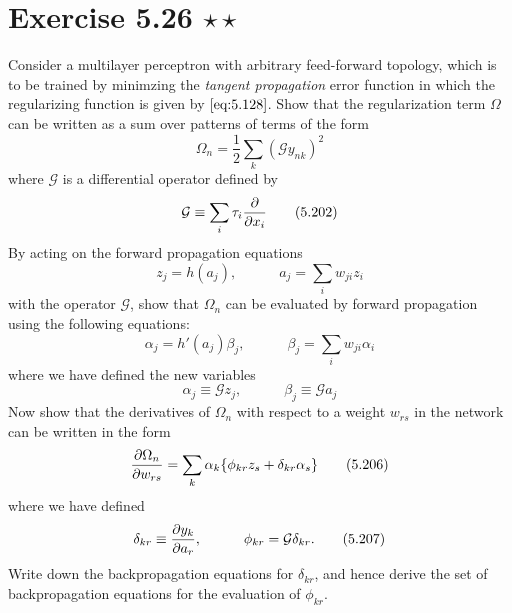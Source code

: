 \section*{Exercise 5.26 $\star \star$}
Consider a multilayer perceptron with arbitrary feed-forward topology, 
which is to be trained by minimzing the \emph{tangent propagation} error
function in which the regularizing function is given by
$\eqref{eq:5.128}$. Show that the regularization term $\Omega$ can
be written as a sum over patterns of terms of the form
\begin{equation*}
    \Omega_n = \frac{1}{2} \sum_{k} (\mathcal{G}y_{nk})^2
    \tag{5.201}\label{eq:5.201}
\end{equation*}
where $\mathcal{G}$ is a differential operator defined by 
\begin{equation*}
    \mathcal{G} \equiv \sum_{i} \tau_i \pdv{x_i}
    \tag{5.202}\label{eq:5.202}
\end{equation*}
By acting on the forward propagation equations
\begin{equation*}
    z_j = h(a_j),
    \hspace{3em}
    a_j = \sum_{i} w_{ji} z_i
    \tag{5.203}\label{eq:5.203}
\end{equation*}
with the operator $\mathcal{G}$, show that $\Omega_n$ 
can be evaluated by forward propagation using the following equations:
\begin{equation*}
    \alpha_j = h'(a_j) \beta_j,
    \hspace{3em}
    \beta_j = \sum_{i} w_{ji} \alpha_i
    \tag{5.204}\label{eq:5.204}
\end{equation*}
where we have defined the new variables
\begin{equation*}
    \alpha_j \equiv \mathcal{G} z_j,
    \hspace{3em}
    \beta_j \equiv \mathcal{G} a_j
    \tag{5.205}\label{eq:5.205}
\end{equation*}
Now show that the derivatives of $\Omega_n$ with respect to a weight $w_{rs}$ in the network 
can be written in the form  
\begin{equation*}
    \pdv{\Omega_n}{w_{rs}} = \sum_{k} \alpha_k \{\phi_{kr} z_s + \delta_{kr} \alpha_s\}
    \tag{5.206}\label{eq:5.206}
\end{equation*}
where we have defined 
\begin{equation*}
    \delta_{kr} \equiv \pdv{y_k}{a_r},
    \hspace{3em}
    \phi_{kr} = \mathcal{G} \delta_{kr}.
    \tag{5.207}\label{eq:5.207}
\end{equation*}
Write down the backpropagation equations for $\delta_{kr}$, and hence derive
the set of backpropagation equations for the evaluation of $\phi_{kr}$.

